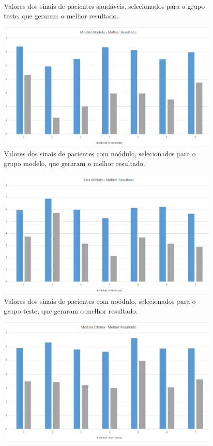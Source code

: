 \documentclass[a4paper,12pt,oneside]{report}
\begin{document}
\begin{appendices}
\begin{figure}
\caption{Valores dos sinais de pacientes saud\'{a}veis, selecionados para o grupo teste, que geraram o melhor resultado. }
\label{fig:normal_teste_melhor}
\end{figure}
\begin{figure}
\centering
\includegraphics[width=0.70\hsize]{figuras_tcc/melhor_resultado/modelo_nodulo_melhor.eps}
\caption{Valores dos sinais de pacientes com no\'{o}dulo, selecionados para o grupo modelo, que geraram o melhor resultado. }
\label{fig:nodulo_modelo_melhor}
\end{figure}
\begin{figure}
\centering
\includegraphics[width=0.70\hsize]{figuras_tcc/melhor_resultado/teste_nodulo_melhor.eps}
\caption{Valores dos sinais de pacientes com no\'{o}dulo, selecionados para o grupo teste, que geraram o melhor resultado. }
\label{fig:nodulo_teste_melhor}
\end{figure}
\begin{figure}
\centering
\includegraphics[width=0.70\hsize]{figuras_tcc/melhor_resultado/modelo_edema_melhor.eps}

\end{figure}
\end{appendices}
\end{document}
